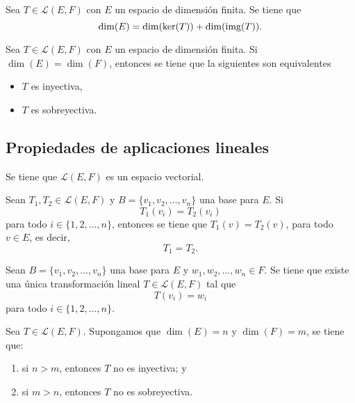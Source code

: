 \documentclass[a4,11pt]{aleph-notas}
\begin{document}
\begin{teo}
    Sea $T \in \mathcal{L}(E,F)$ con $E$ un espacio de dimensión finita. Se tiene que
    \[
        \dim(E) = \dim(\ker(T)) +  \dim(\operatorname{img}(T)).
    \]
\end{teo}   

\begin{teo}
    Sea $T \in \mathcal{L}(E,F)$ con $E$ un espacio de dimensión finita. Si $\dim(E)=\dim(F)$, entonces se tiene que la siguientes son equivalentes
    \begin{itemize}
        \item $T$ es inyectiva,
        \item $T$ es sobreyectiva.
    \end{itemize}
\end{teo}   

\subsection{Propiedades de aplicaciones lineales}

\begin{teo}
    Se tiene que $\mathcal{L}(E,F)$ es un espacio vectorial.
\end{teo}


\begin{teo}
    Sean $T_1,T_2 \in \mathcal{L}(E,F)$ y $B= \{v_1, v_2, \ldots, v_n\}$ una base para $E$. Si
    \[
        T_1(v_i) = T_2(v_i)
    \]
    para todo $i \in \{1, 2, \ldots, n\}$, entonces se tiene que $T_1(v)=T_2(v)$, para todo $v\in E$, es decir, 
    \[
        T_1 = T_2.
    \]
\end{teo}

\begin{teo}
    Sean $B= \{v_1, v_2, \ldots, v_n\}$ una base para $E$ y $w_1, w_2, \ldots, w_n\in F$. Se tiene que existe una única transformación lineal $T \in \mathcal{L}(E,F)$ tal que
    \[
        T(v_i) = w_i
    \]
    para todo $i\in \{1, 2, \ldots, n\}$.
\end{teo}


\begin{teo}
    Sea $T \in \mathcal{L}(E,F)$. Supongamos que $\dim(E) = n$ y $\dim(F) = m$, se tiene que:
    \begin{enumerate}
        \item si $n > m$, entonces $T$ no es inyectiva; y
        \item si $m > n$, entonces $T$ no es sobreyectiva.
    \end{enumerate}
\end{teo} 
\end{document}
